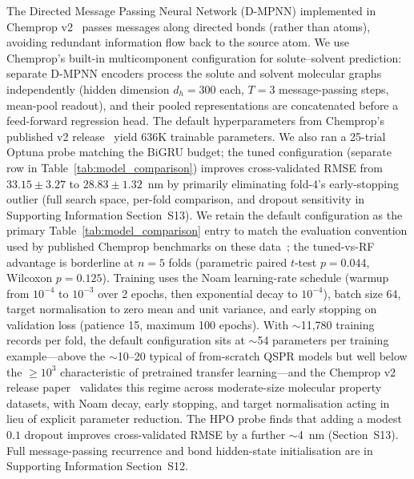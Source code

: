 \documentclass[journal=jcisd8,manuscript=article]{achemso}
\newcommand{\added}[1]{{\color{addedblue}#1}}
\begin{document}
\added{The Directed Message Passing Neural Network (D-MPNN) implemented in Chemprop v2~\cite{yangAnalyzingLearnedMolecular2019,chempropv2_2024} passes messages along directed bonds (rather than atoms), avoiding redundant information flow back to the source atom. We use Chemprop's built-in multicomponent configuration for solute--solvent prediction: separate D-MPNN encoders process the solute and solvent molecular graphs independently (hidden dimension $d_h = 300$ each, $T = 3$ message-passing steps, mean-pool readout), and their pooled representations are concatenated before a feed-forward regression head. The default hyperparameters from Chemprop's published v2 release~\cite{yangAnalyzingLearnedMolecular2019,chempropv2_2024} yield 636K trainable parameters. We also ran a 25-trial Optuna probe matching the BiGRU budget; the tuned configuration (separate row in Table~\ref{tab:model_comparison}) improves cross-validated RMSE from $33.15 \pm 3.27$ to $28.83 \pm 1.32$~nm by primarily eliminating fold-4's early-stopping outlier (full search space, per-fold comparison, and dropout sensitivity in Supporting Information Section~S13). We retain the default configuration as the primary Table~\ref{tab:model_comparison} entry to match the evaluation convention used by published Chemprop benchmarks on these data~\cite{joung2021deep,beard2019comparative,greenman2022multifidelity,jung2024machine,chempropv2_2024}; the tuned-vs-RF advantage is borderline at $n = 5$ folds (parametric paired $t$-test $p = 0.044$, Wilcoxon $p = 0.125$). Training uses the Noam learning-rate schedule (warmup from $10^{-4}$ to $10^{-3}$ over 2 epochs, then exponential decay to $10^{-4}$), batch size 64, target normalisation to zero mean and unit variance, and early stopping on validation loss (patience 15, maximum 100 epochs). With $\sim$11{,}780 training records per fold, the default configuration sits at $\sim$54 parameters per training example---above the $\sim$10--20 typical of from-scratch QSPR models but well below the $\geq 10^3$ characteristic of pretrained transfer learning---and the Chemprop v2 release paper~\cite{chempropv2_2024} validates this regime across moderate-size molecular property datasets, with Noam decay, early stopping, and target normalisation acting in lieu of explicit parameter reduction. The HPO probe finds that adding a modest $0.1$ dropout improves cross-validated RMSE by a further $\sim$4~nm (Section~S13). Full message-passing recurrence and bond hidden-state initialisation are in Supporting Information Section~S12.}


\end{document}
